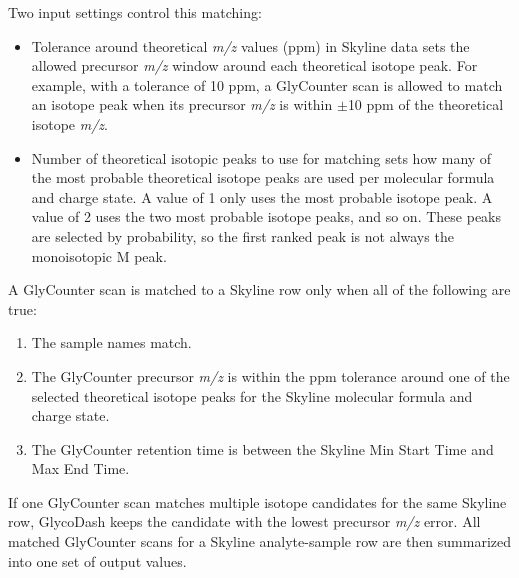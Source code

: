 \begin{optionalbox}
	Two input settings control this matching:
	\begin{itemize}[topsep=0pt, itemsep=0pt]
		\item \textsf{Tolerance around theoretical \textit{m/z} values (ppm) in Skyline data} sets the allowed precursor \textit{m/z} window around each theoretical isotope peak.
		For example, with a tolerance of 10 ppm, a GlyCounter scan is allowed to match an isotope peak when its precursor \textit{m/z} is within $\pm$10 ppm of the theoretical isotope \textit{m/z}.
		\item \textsf{Number of theoretical isotopic peaks to use for matching} sets how many of the most probable theoretical isotope peaks are used per molecular formula and charge state.
		A value of 1 only uses the most probable isotope peak.
		A value of 2 uses the two most probable isotope peaks, and so on.
		These peaks are selected by probability, so the first ranked peak is not always the monoisotopic \textsf{M} peak.
	\end{itemize}
	
	\vspace{.5em}
	A GlyCounter scan is matched to a Skyline row only when all of the following are true:
	\begin{enumerate}[topsep=0pt, itemsep=0pt]
		\item The sample names match.
		\item The GlyCounter precursor \textit{m/z} is within the ppm tolerance around one of the selected theoretical isotope peaks for the Skyline molecular formula and charge state.
		\item The GlyCounter retention time is between the Skyline \textsf{Min Start Time} and \textsf{Max End Time}.
	\end{enumerate}
	
	\vspace{.5em}
	If one GlyCounter scan matches multiple isotope candidates for the same Skyline row, GlycoDash keeps the candidate with the lowest precursor \textit{m/z} error.
	All matched GlyCounter scans for a Skyline analyte-sample row are then summarized into one set of output values.


\end{optionalbox}
